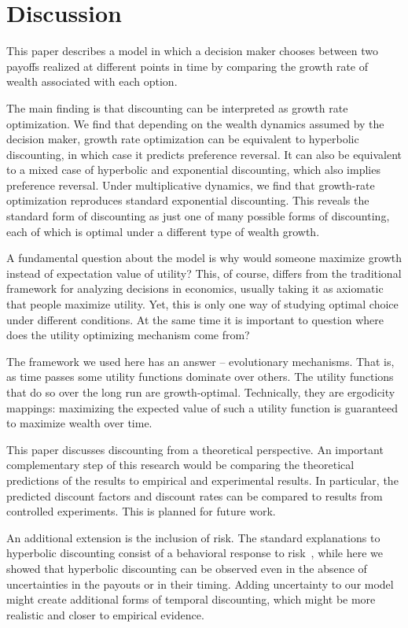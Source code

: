 \documentclass[11pt]{article}
\numberwithin{equation}{section}
\begin{document}
\section{Discussion}\label{sec:discussion}

This paper describes a model in which a decision maker chooses between two payoffs realized at different points in time by comparing the growth rate of wealth associated with each option.

The main finding is that discounting can be interpreted as growth rate optimization. We find that depending on the wealth dynamics assumed by the decision maker, growth rate optimization can be equivalent to hyperbolic discounting, in which case it predicts preference reversal. It can also be equivalent to a mixed case of hyperbolic and exponential discounting, which also implies preference reversal. Under multiplicative dynamics, we find that growth-rate optimization reproduces standard exponential discounting. This reveals the standard form of discounting as just one of many possible forms of discounting, each of which is optimal under a different type of wealth growth.

A fundamental question about the model is why would someone maximize growth instead of expectation value of utility? This, of course, differs from the traditional framework for analyzing decisions in economics, usually taking it as axiomatic that people maximize utility. Yet, this is only one way of studying optimal choice under different conditions. At the same time it is important to question where does the utility optimizing mechanism come from?

The framework we used here has an answer -- evolutionary mechanisms. That is, as time passes some utility functions dominate over others. The utility functions that do so over the long run are growth-optimal. Technically, they are ergodicity mappings: maximizing the expected value of such a utility function is guaranteed to maximize wealth over time.

This paper discusses discounting from a theoretical perspective. An important complementary step of this research would be comparing the theoretical predictions of the results to empirical and experimental results. In particular, the predicted discount factors and discount rates can be compared to results from controlled experiments. This is planned for future work.

An additional extension is the inclusion of risk. The standard explanations to hyperbolic discounting consist of a behavioral response to risk~\citep{sozou1998hyperbolic,dasgupta2005uncertainty}, while here we showed that hyperbolic discounting can be observed even in the absence of uncertainties in the payouts or in their timing. Adding uncertainty to our model might create additional forms of temporal discounting, which might be more realistic and closer to empirical evidence.
\end{document}
